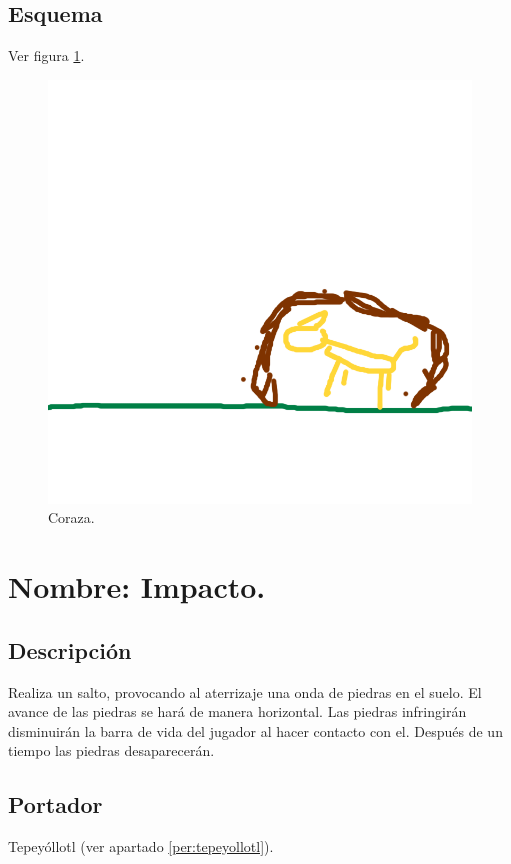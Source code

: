 \subsection{Esquema}
			Ver figura \ref{fig:coraza}.
			\begin{figure}
				\centering
				\includegraphics[height=0.2 \textheight]{Imagenes/coraza}
				\caption{Coraza.}
				\label{fig:coraza}
			\end{figure}
\section{Nombre: Impacto.} \label{hab.impacto}
\subsection{Descripción}
Realiza un salto, provocando al aterrizaje una onda de piedras en el suelo. El avance de las piedras se hará de manera horizontal. Las piedras infringirán disminuirán la barra de vida del jugador al hacer contacto con el. Después de un tiempo las piedras desaparecerán.
\subsection{Portador}
Tepeyóllotl (ver apartado \ref{per:tepeyollotl}).
